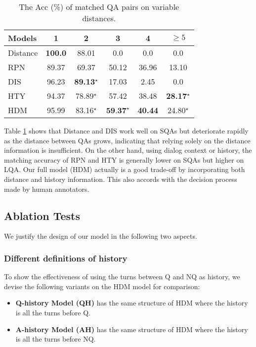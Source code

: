 \begin{table}

	\centering
	\begin{tabular}{p{1.5cm}<{\centering}ccccc}
		\toprule[1.3pt]
		 Models &1&2&3&4&$\geq5$\\
		\midrule[1pt]
		Distance      &\textbf{100.0}&88.01&0.0&0.0&0.0 \\
		RPN  &89.37&69.37&50.12&36.96&13.10\\	
		DIS &96.23&\textbf{89.13}$^\star$&17.03&2.45&0.0\\
		HTY &94.37&78.89$^\star$&57.42&38.48&\textbf{28.17}$^\star$\\
		HDM &95.99&83.16$^\star$&$\textbf{59.37}^\star$&\textbf{40.44}&24.80$^\star$\\
		\bottomrule[1.3pt]
	\end{tabular}
	\vspace{-0.25cm}
	\caption{The Acc (\%) of matched QA pairs on variable distances.}
	\label{tab:longrangeResults}
\end{table}
Table \ref{tab:longrangeResults} shows that Distance and DIS work well on SQAs 
but deteriorate rapidly 
as the distance between QAs grows, indicating that relying solely on 
the distance information is insufficient. 
On the other hand, using dialog context or history, 
the matching accuracy of RPN and HTY is generally lower on SQAs but higher on 
LQA. Our full model (HDM) actually is a good trade-off 
by incorporating both distance and history information. This also accords 
with the decision process made by human annotators.

\subsection{Ablation Tests}
We justify the design of our model in the following two aspects.

\subsubsection{Different definitions of history}

To show the effectiveness of using the turns between Q and NQ 
as history, we devise the following variants on the HDM model 
for comparison:
\begin{itemize}
	\item \textbf{Q-history Model (QH)} has the same structure of HDM where the history is all the turns before Q.
	\item \textbf{A-history Model (AH)} has the same structure of HDM where the history is all the turns before NQ. 
\end{itemize}

